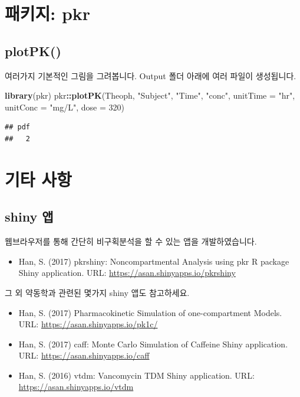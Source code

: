 \documentclass[9pt,]{krantz}
\newenvironment{Shaded}{\begin{snugshade}}{\end{snugshade}}
\newcommand{\DataTypeTok}[1]{\textcolor[rgb]{0.13,0.29,0.53}{#1}}
\newcommand{\DecValTok}[1]{\textcolor[rgb]{0.00,0.00,0.81}{#1}}
\newcommand{\KeywordTok}[1]{\textcolor[rgb]{0.13,0.29,0.53}{\textbf{#1}}}
\newcommand{\NormalTok}[1]{#1}
\newcommand{\OperatorTok}[1]{\textcolor[rgb]{0.81,0.36,0.00}{\textbf{#1}}}
\newcommand{\StringTok}[1]{\textcolor[rgb]{0.31,0.60,0.02}{#1}}
\providecommand{\tightlist}{%
  \setlength{\itemsep}{0pt}\setlength{\parskip}{0pt}}
\begin{document}
\hypertarget{pkr}{%
\chapter{패키지: pkr}\label{pkr}}

\hypertarget{plotpk}{%
\section{plotPK()}\label{plotpk}}

여러가지 기본적인 그림을 그려봅니다. Output 폴더 아래에 여러 파일이 생성됩니다.

\begin{Shaded}
\begin{Highlighting}[]
\KeywordTok{library}\NormalTok{(pkr)}
\NormalTok{pkr}\OperatorTok{::}\KeywordTok{plotPK}\NormalTok{(Theoph, }\StringTok{"Subject"}\NormalTok{, }\StringTok{"Time"}\NormalTok{, }\StringTok{"conc"}\NormalTok{, }
            \DataTypeTok{unitTime =} \StringTok{"hr"}\NormalTok{, }\DataTypeTok{unitConc =} \StringTok{"mg/L"}\NormalTok{, }\DataTypeTok{dose =} \DecValTok{320}\NormalTok{)}
\end{Highlighting}
\end{Shaded}

\begin{verbatim}
## pdf 
##   2
\end{verbatim}

\hypertarget{etc}{%
\chapter{기타 사항}\label{etc}}

\hypertarget{shiny-}{%
\section{shiny 앱}\label{shiny-}}

웹브라우저를 통해 간단히 비구획분석을 할 수 있는 앱을 개발하였습니다.

\begin{itemize}
\tightlist
\item
  Han, S. (2017) pkrshiny: Noncompartmental Analysis using pkr R package Shiny application. URL: \url{https://asan.shinyapps.io/pkrshiny}
\end{itemize}

그 외 약동학과 관련된 몇가지 shiny 앱도 참고하세요.

\begin{itemize}
\tightlist
\item
  Han, S. (2017) Pharmacokinetic Simulation of one-compartment Models. URL: \url{https://asan.shinyapps.io/pk1c/}
\item
  Han, S. (2017) caff: Monte Carlo Simulation of Caffeine Shiny application. URL: \url{https://asan.shinyapps.io/caff}
\item
  Han, S. (2016) vtdm: Vancomycin TDM Shiny application. URL: \url{https://asan.shinyapps.io/vtdm}
\end{itemize}
\end{document}
